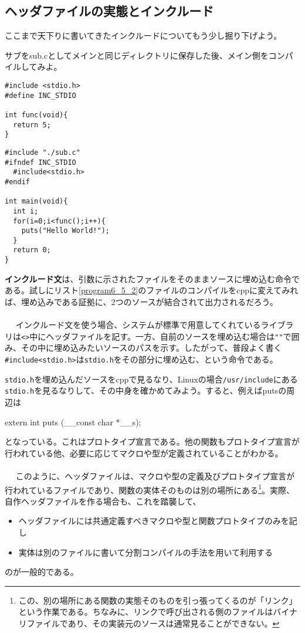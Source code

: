 \subsection{ヘッダファイルの実態とインクルード}
ここまで天下りに書いてきたインクルードについてもう少し掘り下げよう。
\begin{boxnote}
\begin{multicols}{2}
サブをsub.cとしてメインと同じディレクトリに保存した後、メイン側をコンパイルしてみよ。
\begin{lstlisting}[caption=インクルード確認(サブ),label=program6_5_1]
#include <stdio.h>
#define INC_STDIO 

int func(void){
  return 5;
}
\end{lstlisting}
\begin{lstlisting}[caption=インクルード確認(メイン),label=program6_5_2]
#include "./sub.c"
#ifndef INC_STDIO
  #include<stdio.h>
#endif

int main(void){
  int i;
  for(i=0;i<func();i++){
    puts("Hello World!");
  }
  return 0;
}
\end{lstlisting}
\end{multicols}
\end{boxnote}
\textbf{インクルード文}は、引数に示されたファイルをそのままソースに埋め込む命令である。試しにリスト\ref{program6_5_2}のファイルのコンパイルをcppに変えてみれば、埋め込みである証拠に、2つのソースが結合されて出力されるだろう。
\\ \\　
インクルード文を使う場合、システムが標準で用意してくれているライブラリは\verb|<>|中にヘッダファイルを記す。一方、自前のソースを埋め込む場合は\verb|""|で囲み、その中に埋め込みたいソースのパスを示す。したがって、普段よく書く\verb|#include<stdio.h>|は\verb|stdio.h|をその部分に埋め込む、という命令である。

\verb|stdio.h|を埋め込んだソースをcppで見るなり、Linuxの場合\verb|/usr/include|にある\verb|stdio.h|を見るなりして、その中身を確かめてみよう。すると、例えばputsの周辺は
\begin{code}
extern int puts (__const char *__s);
\end{code}
となっている。これはプロトタイプ宣言である。他の関数もプロトタイプ宣言が行われている他、必要に応じてマクロや型が定義されていることがわかる。
\\ \\　
このように、ヘッダファイルは、マクロや型の定義及びプロトタイプ宣言が行われているファイルであり、関数の実体そのものは別の場所にある\footnote{この、別の場所にある関数の実態そのものを引っ張ってくるのが「リンク」という作業である。ちなみに、リンクで呼び出される側のファイルはバイナリファイルであり、その実装元のソースは通常見ることができない。}。実際、自作ヘッダファイルを作る場合も、これを踏襲して、
\begin{itemize}
\item ヘッダファイルには共通定義すべきマクロや型と関数プロトタイプのみを記し
\item 実体は別のファイルに書いて分割コンパイルの手法を用いて利用する
\end{itemize}
のが一般的である。

